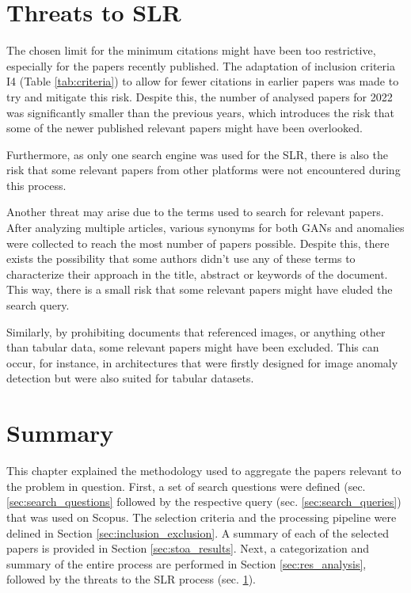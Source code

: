 \section{Threats to SLR}\label{sec:slr_threats}
The chosen limit for the minimum citations might have been too restrictive, especially for the papers recently published. The adaptation of inclusion criteria I4 (Table \ref{tab:criteria}) to allow for fewer citations in earlier papers was made to try and mitigate this risk. Despite this, the number of analysed papers for 2022 was significantly smaller than the previous years, which introduces the risk that some of the newer published relevant papers might have been overlooked. 

Furthermore, as only one search engine was used for the SLR, there is also the risk that some relevant papers from other platforms were not encountered during this process. 

Another threat may arise due to the terms used to search for relevant papers. After analyzing multiple articles, various synonyms for both GANs and anomalies were collected to reach the most number of papers possible. Despite this, there exists the possibility that some authors didn't use any of these terms to characterize their approach in the title, abstract or keywords of the document. This way, there is a small risk that some relevant papers might have eluded the search query.

Similarly, by prohibiting documents that referenced images, or anything other than tabular data, some relevant papers might have been excluded. This can occur, for instance, in architectures that were firstly designed for image anomaly detection but were also suited for tabular datasets.

\section{Summary}\label{sec:summary}
This chapter explained the methodology used to aggregate the papers relevant to the problem in question. First, a set of search questions were defined (sec. \ref{sec:search_questions} followed by the respective query (sec. \ref{sec:search_queries}) that was used on Scopus. The selection criteria and the processing pipeline were delined in Section \ref{sec:inclusion_exclusion}. A summary of each of the selected papers is provided in Section \ref{sec:stoa_results}. Next, a categorization and summary of the entire process are performed in Section \ref{sec:res_analysis}, followed by the threats to the SLR process (sec. \ref{sec:slr_threats}).





